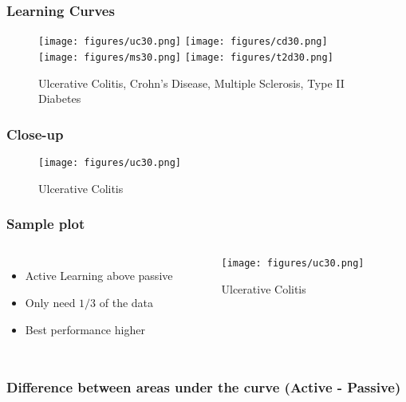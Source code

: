\documentclass{beamer}
\begin{document}
\begin{frame}
\frametitle{Learning Curves} 
\begin{center} 
\begin{figure}
\texttt{[image: figures/uc30.png]} 
\texttt{[image: figures/cd30.png]} \\
\texttt{[image: figures/ms30.png]} 
\texttt{[image: figures/t2d30.png]} \\
\caption{Ulcerative Colitis, Crohn's Disease, Multiple Sclerosis, Type II Diabetes}
\end{figure}
\end{center} 
\end{frame} 

\begin{frame}
\frametitle{Close-up}
\begin{center}
\begin{figure}
\texttt{[image: figures/uc30.png]}
\caption{Ulcerative Colitis}
\end{figure}
\end{center}
\end{frame}

\begin{frame}
\frametitle{Sample plot}
\begin{columns}[c]
\begin{itemize}
\item {\scriptsize Active Learning above passive}
\item {\scriptsize Only need $1/3$ of the data}
\item {\scriptsize Best performance higher}
\end{itemize}
\begin{center}
\begin{figure}
\texttt{[image: figures/uc30.png]}
\caption{Ulcerative Colitis}
\end{figure}
\end{center}
\end{columns}
\end{frame}

\begin{frame}
\frametitle{Difference between areas under the curve (Active - Passive)}
\end{frame}
\end{document}
